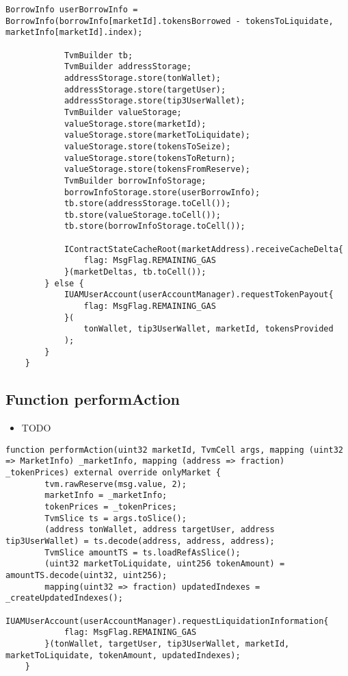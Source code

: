 \begin{lstlisting}[firstnumber=101]
            BorrowInfo userBorrowInfo = BorrowInfo(borrowInfo[marketId].tokensBorrowed - tokensToLiquidate, marketInfo[marketId].index);

            TvmBuilder tb;
            TvmBuilder addressStorage;
            addressStorage.store(tonWallet);
            addressStorage.store(targetUser);
            addressStorage.store(tip3UserWallet);
            TvmBuilder valueStorage;
            valueStorage.store(marketId);
            valueStorage.store(marketToLiquidate);
            valueStorage.store(tokensToSeize);
            valueStorage.store(tokensToReturn);
            valueStorage.store(tokensFromReserve);
            TvmBuilder borrowInfoStorage;
            borrowInfoStorage.store(userBorrowInfo);
            tb.store(addressStorage.toCell());
            tb.store(valueStorage.toCell());
            tb.store(borrowInfoStorage.toCell());

            IContractStateCacheRoot(marketAddress).receiveCacheDelta{
                flag: MsgFlag.REMAINING_GAS
            }(marketDeltas, tb.toCell());
        } else {
            IUAMUserAccount(userAccountManager).requestTokenPayout{
                flag: MsgFlag.REMAINING_GAS
            }(
                tonWallet, tip3UserWallet, marketId, tokensProvided
            );
        }
    }
\end{lstlisting}

\subsection{Function performAction}

\noindent\begin{itemize}
\item TODO
\end{itemize}

\begin{lstlisting}[firstnumber=87]
    function performAction(uint32 marketId, TvmCell args, mapping (uint32 => MarketInfo) _marketInfo, mapping (address => fraction) _tokenPrices) external override onlyMarket {
        tvm.rawReserve(msg.value, 2);
        marketInfo = _marketInfo;
        tokenPrices = _tokenPrices;
        TvmSlice ts = args.toSlice();
        (address tonWallet, address targetUser, address tip3UserWallet) = ts.decode(address, address, address);
        TvmSlice amountTS = ts.loadRefAsSlice();
        (uint32 marketToLiquidate, uint256 tokenAmount) = amountTS.decode(uint32, uint256);
        mapping(uint32 => fraction) updatedIndexes = _createUpdatedIndexes();
        IUAMUserAccount(userAccountManager).requestLiquidationInformation{
            flag: MsgFlag.REMAINING_GAS
        }(tonWallet, targetUser, tip3UserWallet, marketId, marketToLiquidate, tokenAmount, updatedIndexes);
    }
\end{lstlisting}

